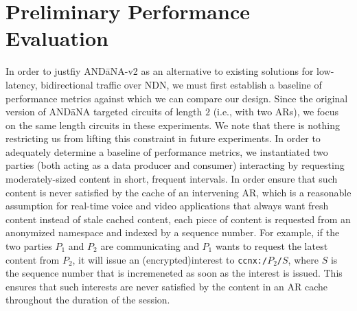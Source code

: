 \documentclass[10pt]{article}
\begin{document}
\section{Preliminary Performance Evaluation}
In order to justfiy {\sf AND\=aNA-v2} as an alternative to existing solutions for low-latency, bidirectional traffic over NDN, we must first establish a baseline of performance metrics against which we can compare our design. Since the original version of {\sf AND\=aNA} targeted circuits of length $2$ (i.e., with two ARs), we focus on the same length circuits in these experiments. We note that there is nothing restricting us from lifting this constraint in future experiments. In order to adequately determine a baseline of performance metrics, we instantiated two parties (both acting as a data producer and consumer) interacting by requesting moderately-sized content in short, frequent intervals. In order ensure that such content is never satisfied by the cache of an intervening AR, which is a reasonable assumption for real-time voice and video applications that always want fresh content instead of stale cached content, each piece of content is requested from an anonymized namespace and indexed by a sequence number. For example, if the two parties $P_1$ and $P_2$ are communicating and $P_1$ wants to request the latest content from $P_2$, it will issue an (encrypted)interest to {\tt ccnx:/$P_2$/$S$}, where $S$ is the sequence number that is incremeneted as soon as the interest is issued. This ensures that such interests are never satisfied by the content in an AR cache throughout the duration of the session. 
\end{document}
